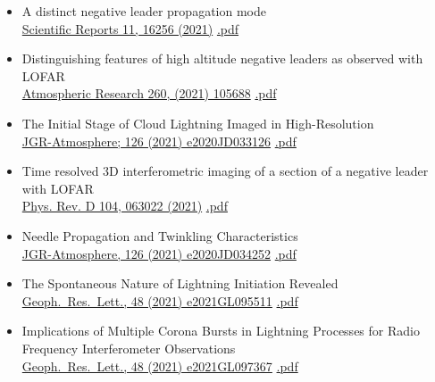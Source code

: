 \documentclass[fleqn,11pt]{article}
\begin{document}
\begin{itemize}
\begin{itemize}
\item A distinct negative leader propagation mode \\ \href{https://doi.org/10.1038/s41598-021-95433-5}{Scientific Reports 11, 16256 (2021)}
    \href{https://drive.google.com/file/d/1XpypnKAxR3FyLykyRzWAoUxFvL28hARR/view?usp=sharing}{.pdf}

\item Distinguishing features of high altitude negative leaders as observed with LOFAR \\ \href{https://doi.org/10.1016/j.atmosres.2021.105688}{Atmospheric Research 260, (2021) 105688}
    \href{https://drive.google.com/file/d/1wLVDcRHtn4y6_8YOZpkGAwZBdRTyYyJX/view?usp=sharing}{.pdf}

\item The Initial Stage of Cloud Lightning Imaged in High-Resolution \\ \href{https://doi.org/10.1029/2020JD033126}{JGR-Atmosphere; 126 (2021) e2020JD033126}
    \href{https://drive.google.com/file/d/19PRFiMgDP3LL4h6mxRXacars_YDTt-cD/view?usp=sharing}{.pdf}

\item Time resolved 3D interferometric imaging of a section of a negative leader with LOFAR
\\ \href{https://doi.org/10.1103/PhysRevD.104.063022}{Phys. Rev. D 104, 063022 (2021)}
\href{https://drive.google.com/file/d/1fJiIpzpxXCTO_vaRikzjwZ3oY4CreHMQ/view?usp=sharing}{.pdf}

\item Needle Propagation and Twinkling Characteristics
\\ \href{https://doi.org/10.1029/2020JD034252}{JGR-Atmosphere, 126 (2021) e2020JD034252}
\href{https://drive.google.com/file/d/1GsGVVHsCDQ-RGP35GaYPmzNjQ4CtE_mj/view?usp=sharing}{.pdf}

\item The Spontaneous Nature of Lightning Initiation Revealed
\\ \href{https://doi.org/10.1029/2021GL095511}{Geoph.\ Res.\ Lett., 48 (2021) e2021GL095511}
\href{https://drive.google.com/file/d/1hHcdxKmEkFMTBIkShz1a8mte5alPVjZc/view?usp=sharing}{.pdf}

\item Implications of Multiple Corona Bursts in Lightning Processes for Radio Frequency Interferometer Observations
\\ \href{https://doi.org/10.1029/2021GL097367}{Geoph.\ Res.\ Lett., 48 (2021) e2021GL097367}
\href{https://drive.google.com/file/d/1CberVxlTCfkoX_lBrbzl3hYMrEZU0aPI/view?usp=sharing}{.pdf}


\end{itemize}
\end{itemize}
\end{document}
